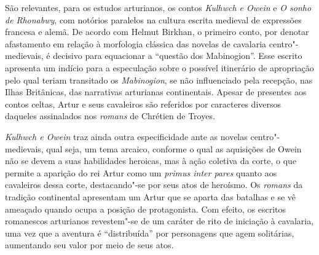 São relevantes, para os estudos arturianos, os contos \textit{Kulhwch e Owein}
e \textit{O sonho de Rhonabwy}, com notórios paralelos na cultura escrita
medieval de expressões francesa e alemã. De acordo com Helmut Birkhan, o
primeiro conto, por denotar afastamento em relação à morfologia clássica das
novelas de cavalaria centro"-medievais, é decisivo para equacionar a “questão
dos Mabinogion”. Esse escrito apresenta um indício para a especulação sobre o
possível itinerário de apropriação pelo qual teriam transitado os
\textit{Mabinogion}, se não influenciado pela recepção, nas Ilhas Britânicas,
das narrativas arturianas continentais. Apesar de presentes aos contos celtas, Artur e seus
cavaleiros são referidos por caracteres diversos daqueles assinalados nos
\textit{romans} de Chrétien de Troyes.

\textit{Kulhwch e Owein }traz ainda outra especificidade ante as novelas
centro"-medievais, qual seja, um tema arcaico, conforme o qual as aquisições de
Owein não se devem a suas habilidades heroicas, mas à ação coletiva da corte, o
que permite a aparição do rei Artur como um \textit{primus inter pares} quanto
aos cavaleiros dessa corte, destacando"-se por seus atos de heroísmo. Os
\textit{romans} da tradição continental apresentam um Artur que se aparta das
batalhas e se vê ameaçado quando ocupa a posição de protagonista. Com efeito,
os escritos romanescos arturianos revestem"-se de um caráter de rito de
iniciação à cavalaria, uma vez que a aventura é “distribuída” por personagens que
agem solitárias, aumentando seu valor por meio de seus atos. 

